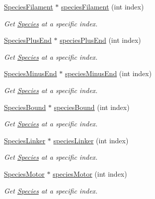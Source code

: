 {\bf }\par
\begin{DoxyCompactItemize}
\item 
\hyperlink{classSpeciesFilament}{Species\+Filament} $\ast$ \hyperlink{classCMonomer_ad69c6060f307b00463bf59b697846344}{species\+Filament} (int index)
\begin{DoxyCompactList}\small\item\em Get \hyperlink{classSpecies}{Species} at a specific index. \end{DoxyCompactList}\item 
\hyperlink{classSpeciesPlusEnd}{Species\+Plus\+End} $\ast$ \hyperlink{classCMonomer_a1923cdc3adc910d1eb83bb6873b9864c}{species\+Plus\+End} (int index)
\begin{DoxyCompactList}\small\item\em Get \hyperlink{classSpecies}{Species} at a specific index. \end{DoxyCompactList}\item 
\hyperlink{classSpeciesMinusEnd}{Species\+Minus\+End} $\ast$ \hyperlink{classCMonomer_a61893c36bc55172a9a534b1caebc7b8b}{species\+Minus\+End} (int index)
\begin{DoxyCompactList}\small\item\em Get \hyperlink{classSpecies}{Species} at a specific index. \end{DoxyCompactList}\item 
\hyperlink{classSpeciesBound}{Species\+Bound} $\ast$ \hyperlink{classCMonomer_a237d02b3b2e0ecf83ed798f2c0107250}{species\+Bound} (int index)
\begin{DoxyCompactList}\small\item\em Get \hyperlink{classSpecies}{Species} at a specific index. \end{DoxyCompactList}\item 
\hyperlink{classSpeciesLinker}{Species\+Linker} $\ast$ \hyperlink{classCMonomer_a71d55b070c58b90f439c0f9fd14efe4f}{species\+Linker} (int index)
\begin{DoxyCompactList}\small\item\em Get \hyperlink{classSpecies}{Species} at a specific index. \end{DoxyCompactList}\item 
\hyperlink{classSpeciesMotor}{Species\+Motor} $\ast$ \hyperlink{classCMonomer_a8cfa76dbac04ef9eeca54b93208e064f}{species\+Motor} (int index)
\begin{DoxyCompactList}\small\item\em Get \hyperlink{classSpecies}{Species} at a specific index. \end{DoxyCompactList}\end{DoxyCompactItemize}

